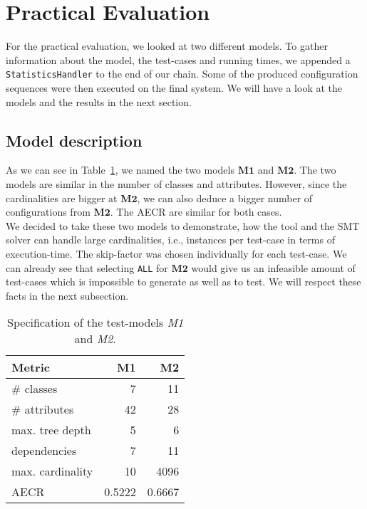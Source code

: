 \section{Practical Evaluation}\label{sec:practical-eval}

For the practical evaluation, we looked at two different models. To gather information about the model, the test-cases and running times, we appended a \texttt{StatisticsHandler} to the end of our chain. Some of the produced configuration sequences were then executed on the final system.
We will have a look at the models and the results in the next section.

\subsection{Model description}

As we can see in Table~\ref{tab:specs}, we named the two models $\mathbf{M1}$ and $\mathbf{M2}$. The two models are similar in the number of classes and attributes. However, since the cardinalities are bigger at $\mathbf{M2}$, we can also deduce a bigger number of configurations from $\mathbf{M2}$. The AECR are similar for both cases.\\

We decided to take these two models to demonstrate, how the tool and the SMT solver can handle large cardinalities, i.e., instances per test-case in terms of execution-time. The skip-factor was chosen individually for each test-case. We can already see that selecting \verb|ALL| for $\mathbf{M2}$ would give us an infeasible amount of test-cases which is impossible to generate as well as to test. We will respect these facts in the next subsection.

\renewcommand{\arraystretch}{1.3}
\begin{table}
\centering
\begin{tabular}{|l|r|r|}
\hline
\textbf{Metric} & \textbf{M1} & \textbf{M2}\\ \hline
\# classes & 7 & 11\\ \hline
\# attributes & 42 & 28\\ \hline
max. tree depth & 5 & 6\\ \hline
dependencies & 7 & 11\\ \hline
max. cardinality & 10 & 4096\\ \hline
AECR & 0.5222 & 0.6667\\ \hline
\end{tabular}
\caption{Specification of the test-models \emph{M1} and \emph{M2}.}\label{tab:specs}
\end{table}

